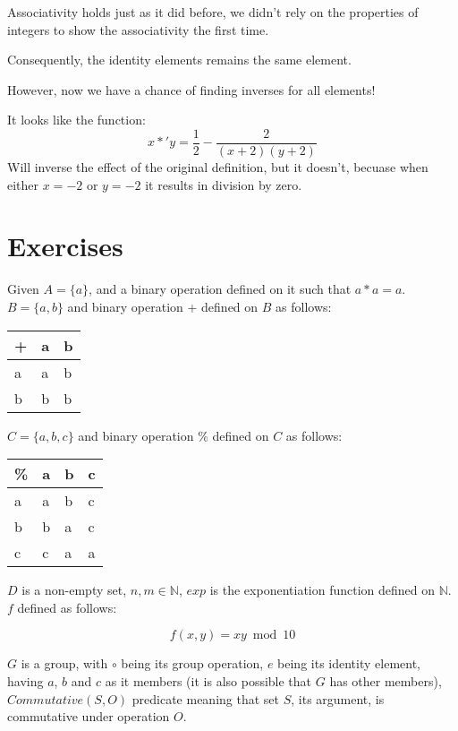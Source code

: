 \documentclass[11pt]{article}
\begin{document}
Associativity holds just as it did before, we didn't rely on the properties of
integers to show the associativity the first time.

Consequently, the identity elements remains the same element.

However, now we have a chance of finding inverses for all elements!

It looks like the function:
\begin{equation}
x *' y = \frac{1}{2} - \frac{2}{(x + 2)(y + 2)}
\end{equation}
Will inverse the effect of the original definition, but it doesn't, becuase when
either $x = -2$ or $y = -2$ it results in division by zero.
\section{Exercises}
\label{sec-2}
Given $A = \{a\}$, and a binary operation defined on it such that $a * a = a$.
$B = \{a, b\}$ and binary operation + defined on $B$ as follows:

\begin{center}
\begin{tabular}{lll}
+ & a & b\\
\hline
a & a & b\\
b & b & b\\
\end{tabular}
\end{center}

$C = \{a, b, c\}$  and binary operation \% defined on $C$ as follows:

\begin{center}
\begin{tabular}{llll}
\% & a & b & c\\
\hline
a & a & b & c\\
b & b & a & c\\
c & c & a & a\\
\end{tabular}
\end{center}

$D$ is a non-empty set, $n, m \in \mathbb{N}$, $exp$ is the exponentiation function
defined on $\mathbb{N}$. $f$ defined as follows:

\begin{equation}
f(x, y) = xy \bmod 10
\end{equation}

$G$ is a group, with $\circ$ being its group operation, $e$ being its identity
element, having $a$, $b$ and $c$ as it members (it is also possible that $G$
has other members), $Commutative(S, O)$ predicate meaning that set $S$, its argument,
is commutative under operation $O$.
\end{document}
